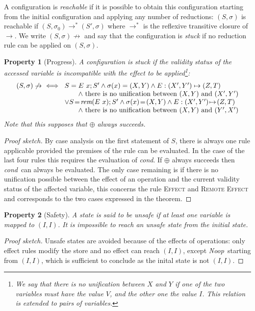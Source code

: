 \documentclass[preprint,12pt]{elsarticle}
\newcommand{\symb}[1]{\textit{#1}}
\newcommand{\noop}{\symb{Noop}}
\newcommand{\cond}{\symb{cond}}
\newcommand{\rem}[1]{\symb{rem}(#1)}
\newtheorem{Property}{Property}
\begin{document}
A configuration is \emph{reachable} if it is possible to obtain this configuration 
starting from the initial configuration and applying any number of reductions: 
$(S,\sigma)$ is reachable if $(S,\sigma_0)\to^*(S',\sigma)$ where $\to^*$ is the 
reflexive 
transitive closure of $\to$. We write $(S,\sigma)\not\to $ and say that the configuration 
is \emph{stuck} if no reduction rule can be 
applied on $(S,\sigma)$.
\begin{Property}[Progress]\label{prop:stuck}
 A configuration is stuck if the validity status of the accessed variable is 
incompatible with the effect to be applied\footnote{We say that there is no unification  between $X$ and $Y$ if one of the two variables must have the value $V$, and the other one the value $I$. This relation is extended to pairs of variables.}:
\[\begin{array}{@{}l@{}}
(S,\sigma)\not\to\ \iff~
 \begin{array}[t]{@{}l@{}}
S=E~x;S' \land \sigma(x)=(X,Y) 
							\land E:  (X',Y')\mapsto (Z,T)\ 
						\\\qquad 	\land~\text{there is no unification  between } 
							(X,Y)   
							\text{ and } (X',Y')\\
\lor S\!=\!\rem{E~x};S' \land \sigma(x)\!=\!(X,Y) 
							\land E:  (X',Y')\!\mapsto\! (Z,T)\ 
							\\\qquad \land~\text{there is no unification  between } 
							(X,Y)   
							\text{ and } (Y',X')		
\end{array}
\end{array}\]
Note that this supposes that $\oplus$ always succeeds.
\end{Property}
\begin{proof}[Proof sketch]
By case analysis on the first statement of $S$, there is always 
one rule applicable provided the premises of the rule can be evaluated.
In the case of the last four rules this requires the evaluation of \cond. If $\oplus$ 
always succeeds then \cond\ can always be 
evaluated. The only case remaining is if there is no unification possible between the 
effect of an operation and the current validity status of the affected variable, this 
concerns the rule \textsc{Effect} and \textsc{Remote Effect} and corresponds to the two 
cases expressed in the theorem.
\end{proof}


\begin{Property}[Safety]\label{prop:safe}
A state is said to be \emph{unsafe} if at least one variable is mapped to 
$(I,I)$.
It is impossible to reach an unsafe state from the initial state.
\end{Property}
\begin{proof}[Proof sketch] 
Unsafe states are avoided  because of the effects of operations: 
only effect rules modify the store and no effect can reach $(I,I)$, except 
\noop\ starting from $(I,I)$, which is sufficient to conclude as the inital state is not $(I,I)$.
\end{proof}
\end{document}
